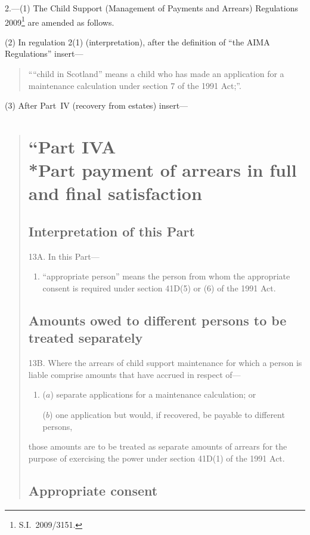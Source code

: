 \documentclass[12pt,a4paper]{article}
\begin{document}
2.---(1)  The Child Support (Management of Payments and Arrears) Regulations 2009\footnote{S.I.~2009/3151.} are amended as follows.

(2) In regulation 2(1) (interpretation), after the definition of “the AIMA Regulations” insert—
\begin{quotation}
““child in Scotland” means a child who has made an application for a maintenance calculation under section 7 of the 1991 Act;”.
\end{quotation}

(3) After Part~IV (recovery from estates) insert—
\begin{quotation}
\section*{“Part IVA\\*Part payment of arrears in full and final satisfaction}

\subsection*{Interpretation of this Part}

13A.  In this Part—
\begin{enumerate}\item[]
“appropriate person” means the person from whom the appropriate consent is required under section 41D(5) or (6) of the 1991 Act.
\end{enumerate}

\subsection*{\sloppy Amounts owed to different persons to be treat\-ed separately}

13B.  Where the arrears of child support maintenance for which a person is liable comprise amounts that have accrued in respect of—
\begin{enumerate}\item[]
($a$) separate applications for a maintenance calculation; or

($b$) one application but would, if recovered, be payable to different persons,
\end{enumerate}
those amounts are to be treated as separate amounts of arrears for the purpose of exercising the power under section 41D(1) of the 1991 Act.

\subsection*{Appropriate consent}


\end{quotation}
\end{document}
